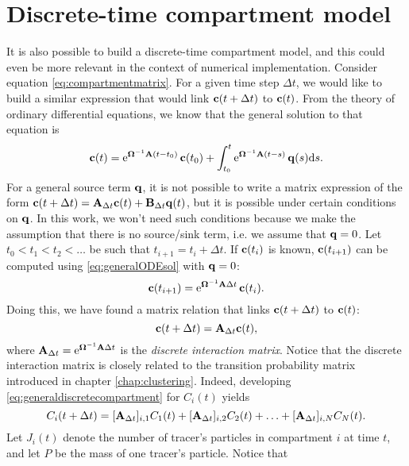 \section{Discrete-time compartment model} \label{sec:dtcm(chapcomp)}
It is also possible to build a discrete-time compartment model, and this could even be more relevant in the context of numerical implementation. Consider equation \eqref{eq:compartmentmatrix}. For a given time step $\Delta t$, we would like to build a similar expression that would link $\mathbf c(t+\Delta t)$ to $\mathbf c(t)$. From the theory of ordinary differential equations, we know that the general solution to that equation is
\begin{equation} \label{eq:generalODEsol}
	\mathbf c(t) = \operatorname{e}^{\boldsymbol \Omega^{-1}\mathbf A(t-t_0)} \mathbf c(t_0) + \int_{t_0}^t \operatorname{e}^{\boldsymbol \Omega^{-1}\mathbf A(t-s)} \mathbf q(s) \mathrm ds.
\end{equation}
For a general source term $\mathbf q$, it is not possible to write a matrix expression of the form $\mathbf c(t+\Delta t) = \mathbf A_{\Delta t} \mathbf c(t) + \mathbf B_{\Delta t} \mathbf q(t)$, but it is possible under certain conditions on $\mathbf q$. In this work, we won't need such conditions because we make the assumption that there is no source/sink term, i.e. we assume that $\mathbf q = 0$. Let $t_0 < t_1 < t_2 < \dots$ be such that $t_{i+1} = t_i + \Delta t$. If $\mathbf c(t_i)$ is known, $\mathbf c(t_{i+1})$ can be computed using \eqref{eq:generalODEsol} with $\mathbf q = 0$:
\begin{equation}
	\mathbf c(t_{i+1}) = \operatorname{e}^{\boldsymbol \Omega^{-1}\mathbf A\Delta t} \mathbf c(t_i).
\end{equation}
Doing this, we have found a matrix relation that links $\mathbf c(t+\Delta t)$ to $\mathbf c(t)$:
\begin{equation} \label{eq:generaldiscretecompartment}
	\mathbf c(t + \Delta t) = \mathbf A_{\Delta t} \mathbf c(t),
\end{equation}
where $\mathbf A_{\Delta t} = \operatorname{e}^{\boldsymbol \Omega^{-1}\mathbf A\Delta t}$ is the \textit{discrete interaction matrix}. Notice that the discrete interaction matrix is closely related to the transition probability matrix introduced in chapter \ref{chap:clustering}. Indeed, developing \eqref{eq:generaldiscretecompartment} for $C_i(t)$ yields
\begin{equation} \label{eq:crapaud}
	C_i(t+\Delta t) = [\mathbf A_{\Delta t}]_{i,1} C_{1}(t) + [\mathbf A_{\Delta t}]_{i,2} C_{2}(t) + \ldots + [\mathbf A_{\Delta t}]_{i,N} C_{N}(t).  	
\end{equation}
Let $J_i(t)$ denote the number of tracer's particles in compartment $i$ at time $t$, and let $P$ be the mass of one tracer's particle. Notice that

